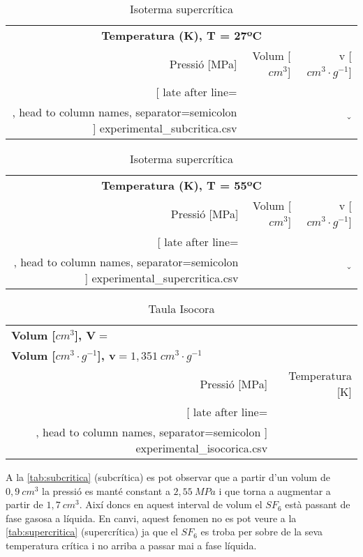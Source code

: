\documentclass[a4paper]{article}
\begin{document}
\begin{table}[H]
	\begin{minipage}[t][8,3cm][b]{0.49\linewidth}
		\begin{tabular}{rrr}
			\multicolumn{3}{c}{\bf Temperatura (K), T = 27ºC} \\
			Pressió [MPa] & Volum [$cm^3$] & v [$cm^3 · g^{-1}$] \\
			\hline
			\csvreader[
					late after line=\\, 
					head to column names, separator=semicolon
				]
				{experimental_subcritica.csv}{}{\P & \V & \v }
		\end{tabular}
		\vfill
		\caption{Isoterma subcrítica}
		\label{tab:subcritica}
	\end{minipage}
	\begin{minipage}[t][8,3cm][b]{0.49\linewidth}
		\begin{tabular}{rrr}
			\multicolumn{3}{c}{\bf Temperatura (K), T = 55ºC} \\
			Pressió [MPa] & Volum [$cm^3$] & v [$cm^3 · g^{-1}$] \\
			\hline
			\csvreader[
					late after line=\\, 
					head to column names, separator=semicolon
				]
				{experimental_supercritica.csv}{}{\P & \V & \v }
		\end{tabular}
		\vfill
		\caption{Isoterma supercrítica}
		\label{tab:supercritica}
	\end{minipage}
\end{table}

\begin{table}[H]
	\centering
	\begin{tabular}{rr}
		\multicolumn{2}{l}{\textbf{Volum [$cm^3$], $\boldsymbol{V} = $ }} \\ 
		\multicolumn{2}{l}{\textbf{Volum [$cm^3 · g^{-1}$], $\boldsymbol{v} = 1,351\ cm^3·g^{-1}$ }}  \\
		Pressió [MPa] & Temperatura [K] \\
		\hline
		\csvreader[
				late after line=\\, 
				head to column names, separator=semicolon
			]
			{experimental_isocorica.csv}{}{ \P & \T }
	\end{tabular}
	\caption{Taula Isocora}
	\label{tab:isocora}
\end{table}

A la \autoref{tab:subcritica} (subcrítica) es pot observar que a partir d'un volum de $0,9\ cm^3$ la pressió es manté constant a $2,55\ MPa$ i que torna a augmentar a partir de $1,7\ cm^3$. Així doncs en aquest interval de volum el $SF_6$ està passant de fase gasosa a líquida. En canvi, aquest fenomen no es pot veure a la \autoref{tab:supercritica} (supercrítica) ja que el $SF_6$ es troba per sobre de la seva temperatura crítica i no arriba a passar mai a fase líquida.
\end{document}
